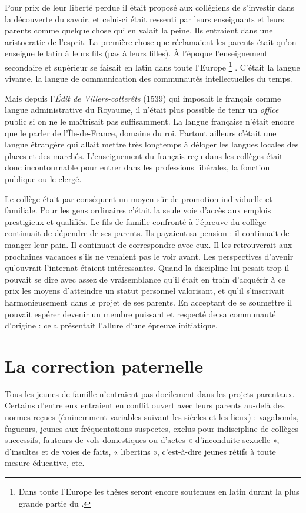  Pour prix de leur liberté perdue il était proposé aux collégiens de s'investir dans la découverte du savoir, et celui-ci était ressenti par leurs enseignants et leurs parents comme quelque chose qui en valait la peine. Ils entraient dans une aristocratie de l'esprit. La première chose que réclamaient les parents était qu'on enseigne le latin à leurs fils (pas à leurs filles). À l'époque l'enseignement secondaire et supérieur se faisait en latin dans toute l'Europe%
\footnote{Dans toute l'Europe les thèses seront encore soutenues en latin durant la plus grande partie du .}%
. C'était la langue vivante, la langue de communication des communautés intellectuelles du temps. 

 Mais depuis l'\emph{Édit de Villers-cotterêts} (1539) qui imposait le français comme langue administrative du Royaume, il n'était plus possible de tenir un \emph{office} public si on ne le maîtrisait pas suffisamment. La langue française n'était encore que le parler de l'Île-de-France, domaine du roi. Partout ailleurs c'était une langue étrangère qui allait mettre très longtemps à déloger les langues locales des places et des marchés. L'enseignement du français reçu dans les collèges était donc incontournable pour entrer dans les professions libérales, la fonction publique ou le clergé. 

 Le collège était par conséquent un moyen sûr de promotion individuelle et familiale. Pour les gens ordinaires c'était la seule voie d'accès aux emplois prestigieux et qualifiés. Le fils de famille confronté à l'épreuve du collège continuait de dépendre de ses parents. Ils payaient sa pension : il continuait de manger leur pain. Il continuait de correspondre avec eux. Il les retrouverait aux prochaines vacances s'ils ne venaient pas le voir avant. Les perspectives d'avenir qu'ouvrait l'internat étaient intéressantes. Quand la discipline lui pesait trop il pouvait se dire avec assez de vraisemblance qu'il était en train d'acquérir à ce prix les moyens d'atteindre un statut personnel valorisant, et qu'il s'inscrivait harmonieusement dans le projet de ses parents. En acceptant de se soumettre il pouvait espérer devenir un membre puissant et respecté de sa communauté d'origine : cela présentait l'allure d'une épreuve initiatique. 

\section{La correction paternelle}

 Tous les jeunes de famille n'entraient pas docilement dans les projets parentaux. Certains d'entre eux entraient en conflit ouvert avec leurs parents au-delà des normes reçues (éminemment variables suivant les siècles et les lieux) : vagabonds, fugueurs, jeunes aux fréquentations suspectes, exclus pour indiscipline de collèges successifs, fauteurs de vols domestiques ou d'actes « d'inconduite sexuelle », d'insultes et de voies de faits, « libertins », c'est-à-dire jeunes rétifs à toute mesure éducative, etc. 

